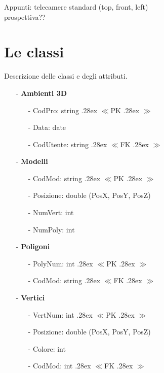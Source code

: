 \documentclass[a4paper,12pt]{report}
\def\lcap{\hskip 0pt \raise .28ex \hbox{\tiny $\ll$}}
\def\rcap{\hskip 0pt \raise .28ex \hbox{\tiny $\gg$}}
\begin{document}
Appunti: 
telecamere standard (top, front, left)\\
prospettiva??\\
\newpage
\section{Le classi}
Descrizione delle classi e degli attributi.
\begin{itemize}
	\item[-] {\bf Ambienti 3D}
		\begin{small}\begin{itemize}
			\item[-] CodPro: string \lcap PK\rcap
			\item[-] Data: date
			\item[-] CodUtente: string \lcap FK\rcap
		\end{itemize}\end{small}
\end{itemize}
\begin{itemize}
	\item[-] {\bf Modelli}
		\begin{small}\begin{itemize}
			\item[-] CodMod: string \lcap PK\rcap 
			\item[-] Posizione: double (PosX, PosY, PosZ)
			\item[-] NumVert: int
			\item[-] NumPoly: int
		\end{itemize}\end{small}
	\item[-] {\bf Poligoni}
		\begin{small}\begin{itemize}
			\item[-] PolyNum: int \lcap PK\rcap 
			\item[-] CodMod: string \lcap FK\rcap 
		\end{itemize}\end{small}
	\item[-] {\bf Vertici}
		\begin{small}\begin{itemize}
			\item[-] VertNum: int \lcap PK\rcap 
			\item[-] Posizione: double (PosX, PosY, PosZ)
			\item[-] Colore: int
			\item[-] CodMod: int \lcap FK\rcap 
		\end{itemize}\end{small}
\end{itemize}
\end{document}

